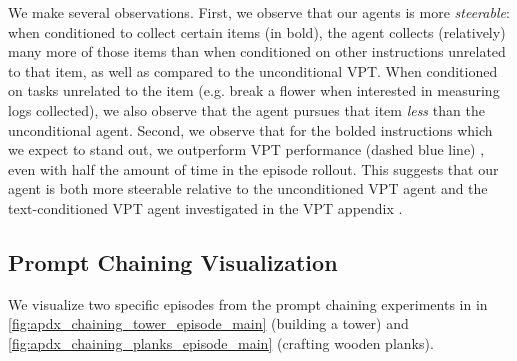 We make several observations. First, we observe that our agents is more \textit{steerable}: when conditioned to collect certain items (in bold), the agent collects (relatively) many more of those items than when conditioned on other instructions unrelated to that item, as well as compared to the unconditional VPT. When conditioned on tasks unrelated to the item (e.g. break a flower when interested in measuring logs collected), we also observe that the agent pursues that item \textit{less} than the unconditional agent. Second, we observe that for the bolded instructions which we expect to stand out, we outperform VPT performance (dashed blue line) \citep{baker2022vpt}, even with half the amount of time in the episode rollout. This suggests that our agent is both more steerable relative to the unconditioned VPT agent and the text-conditioned VPT agent investigated in the VPT appendix \citep{baker2022vpt}.


\subsection{Prompt Chaining Visualization}
We visualize two specific episodes from the prompt chaining experiments in  in \autoref{fig:apdx_chaining_tower_episode_main} (building a tower) and \autoref{fig:apdx_chaining_planks_episode_main} (crafting wooden planks). 

